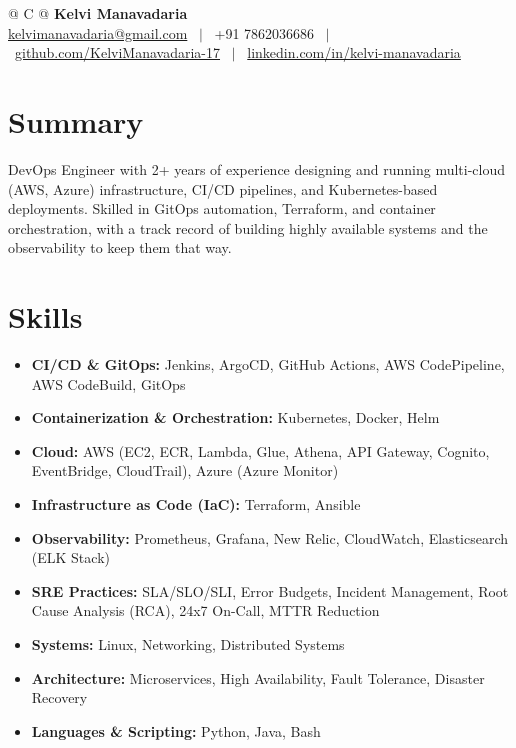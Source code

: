 \documentclass[a4paper,10.999999pt]{article}
\begin{document}
    \pagestyle{empty}



    \begin{tabularx}{\linewidth}{@{} C @{}}
    \LARGE{\textbf{Kelvi Manavadaria}} \\[4pt]
    \href{mailto:kelvimanavadaria@gmail.com}{kelvimanavadaria@gmail.com} \ $|$ \
    +91 7862036686 \ $|$ \
    \href{https://github.com/KelviManavadaria-17}{github.com/KelviManavadaria-17} \ $|$ \
    \href{https://www.linkedin.com/in/kelvi-manavadaria/}{linkedin.com/in/kelvi-manavadaria}
    \end{tabularx}


    \section{Summary}
DevOps Engineer with 2+ years of experience designing and running multi-cloud (AWS, Azure) infrastructure, CI/CD pipelines, and Kubernetes-based deployments. Skilled in GitOps automation, Terraform, and container orchestration, with a track record of building highly available systems and the observability to keep them that way.


    \section{Skills}
    \begin{itemize}[leftmargin=1.5em, itemsep=2pt, label=\raisebox{0.25ex}{\tiny$\circ$}]
    \item \textbf{CI/CD \& GitOps:} Jenkins, ArgoCD, GitHub Actions, AWS CodePipeline, AWS CodeBuild, GitOps
    \item \textbf{Containerization \& Orchestration:} Kubernetes, Docker, Helm
    \item \textbf{Cloud:} AWS (EC2, ECR, Lambda, Glue, Athena, API Gateway, Cognito, EventBridge, CloudTrail), Azure (Azure Monitor)
    \item \textbf{Infrastructure as Code (IaC):} Terraform, Ansible
    \item \textbf{Observability:} Prometheus, Grafana, New Relic, CloudWatch, Elasticsearch (ELK Stack)
    \item \textbf{SRE Practices:} SLA/SLO/SLI, Error Budgets, Incident Management, Root Cause Analysis (RCA), 24x7 On-Call, MTTR Reduction
    \item \textbf{Systems:} Linux, Networking, Distributed Systems
    \item \textbf{Architecture:} Microservices, High Availability, Fault Tolerance, Disaster Recovery
    \item \textbf{Languages \& Scripting:} Python, Java, Bash
    \end{itemize}
\end{document}
